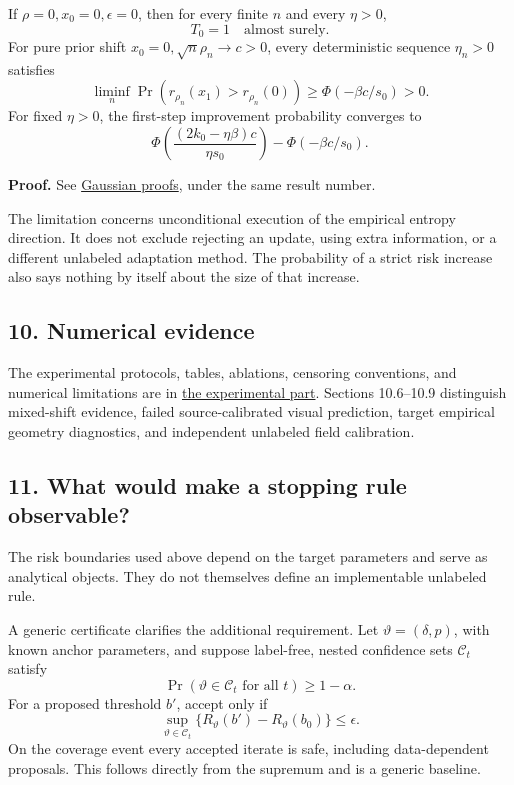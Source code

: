 If \(\rho=0,x_0=0,\epsilon=0\), then for every finite \(n\) and every
\(\eta>0\), \[
T_0=1\quad\text{almost surely}.
\] For pure prior shift \(x_0=0,\sqrt n\rho_n\to c>0\), every
deterministic sequence \(\eta_n>0\) satisfies \[
\liminf_n\Pr(r_{\rho_n}(x_1)>r_{\rho_n}(0))
\ge\Phi(-\beta c/s_0)>0.
\] For fixed \(\eta>0\), the first-step improvement probability
converges to \[
\Phi\!\left(\frac{(2k_0-\eta\beta)c}{\eta s_0}\right)
-\Phi(-\beta c/s_0).
\]

\textbf{Proof.} See \href{gaussian_proofs.md}{Gaussian proofs}, under
the same result number.

The limitation concerns unconditional execution of the empirical entropy
direction. It does not exclude rejecting an update, using extra
information, or a different unlabeled adaptation method. The probability
of a strict risk increase also says nothing by itself about the size of
that increase.

\subsection{10. Numerical evidence}\label{draft-numerical-evidence}

The experimental protocols, tables, ablations, censoring conventions,
and numerical limitations are in \href{experiments.md}{the experimental
part}. Sections 10.6--10.9 distinguish mixed-shift evidence, failed
source-calibrated visual prediction, target empirical geometry
diagnostics, and independent unlabeled field calibration.

\subsection{11. What would make a stopping rule
observable?}\label{draft-what-would-make-a-stopping-rule-observable}

The risk boundaries used above depend on the target parameters and serve
as analytical objects. They do not themselves define an implementable
unlabeled rule.

A generic certificate clarifies the additional requirement. Let
\(\vartheta=(\delta,p)\), with known anchor parameters, and suppose
label-free, nested confidence sets \(\mathcal C_t\) satisfy \[
\Pr(\vartheta\in\mathcal C_t\text{ for all }t)\ge1-\alpha.
\] For a proposed threshold \(b'\), accept only if \[
\sup_{\vartheta\in\mathcal C_t}
\{R_\vartheta(b')-R_\vartheta(b_0)\}\le\epsilon.
\] On the coverage event every accepted iterate is safe, including
data-dependent proposals. This follows directly from the supremum and is
a generic baseline.

